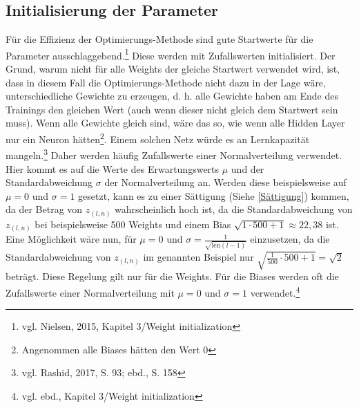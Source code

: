\documentclass[
	a4paper,
	12pt,
	ngerman,
	oneside
]{scrreprt}											%
\begin{document}
			\subsection{Initialisierung der Parameter} \label{TodsündenWeights}
				\enlargethispage{0.2\baselineskip}
				Für die Effizienz der Optimierungs-Methode sind gute Startwerte für die Parameter ausschlaggebend.\footnote{vgl. Nielsen, 2015, Kapitel 3/Weight initialization} Diese werden mit Zufallswerten initialisiert. Der Grund, warum nicht für alle Weights der gleiche Startwert verwendet wird, ist, dass in diesem Fall die Optimierungs-Methode nicht dazu in der Lage wäre, unterschiedliche Gewichte zu erzeugen, d. h. alle Gewichte haben am Ende des Trainings den gleichen Wert (auch wenn dieser nicht gleich dem Startwert sein muss). Wenn alle Gewichte gleich sind, wäre das so, wie wenn alle Hidden Layer nur ein Neuron hätten\footnote{Angenommen alle Biases hätten den Wert 0}. Einem solchen Netz würde es an Lernkapazität mangeln.\footnote{vgl. Rashid, 2017, S. 93; ebd., S. 158}
				Daher werden häufig Zufallswerte einer Normalverteilung verwendet. Hier kommt es auf die Werte des Erwartungswerts $\mu$ und der Standardabweichung $\sigma$ der Normalverteilung an. Werden diese beispielsweise auf $\mu = 0$ und $\sigma = 1$ gesetzt, kann es zu einer Sättigung (Siehe \ref{Sättigung}) kommen, da der Betrag von $z_{(l,n)}$ wahrscheinlich hoch ist, da die Standardabweichung von $z_{(l,n)}$ bei beispielsweise 500 Weights und einem Bias $\sqrt{1 \cdot 500 + 1} \approx 22,38$ ist. Eine Möglichkeit wäre nun, für $\mu = 0$ und $\sigma = \frac{1}{\sqrt{\textrm{len}(l-1)}}$ einzusetzen, da die Standardabweichung von $z_{(l,n)}$ im genannten Beispiel nur $\sqrt{\frac{1}{500} \cdot 500 + 1} = \sqrt{2}$ beträgt. Diese Regelung gilt nur für die Weights. Für die Biases werden oft die Zufallswerte einer Normalverteilung mit $\mu = 0$ und $\sigma = 1$ verwendet.\footnote{vgl. ebd., Kapitel 3/Weight initialization}
	
	
\end{document}
